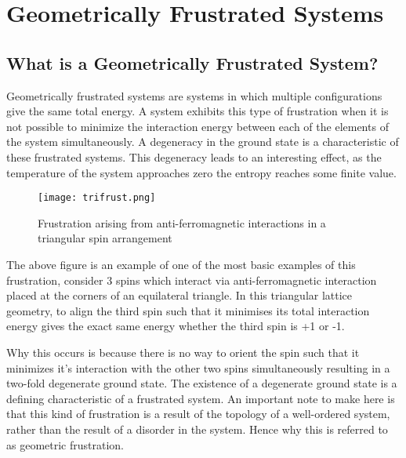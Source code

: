 \section{Geometrically Frustrated Systems}
\subsection{What is a Geometrically Frustrated System?}
Geometrically frustrated systems are systems in which multiple configurations give the same total energy.  A system exhibits this type of frustration when it is not possible to minimize the interaction energy between each of the elements of the system simultaneously. A degeneracy in the ground state is a characteristic of these frustrated systems. This degeneracy leads to an interesting effect, as the temperature of the system approaches zero the entropy reaches some finite value.
\par
\begin{figure}[ht!]
    \begin{center}
        \texttt{[image: trifrust.png]}
        \caption[Triangular spin arrangement]{Frustration arising from anti-ferromagnetic interactions in a triangular spin arrangement}
        \label{fig:gf1}
    \end{center}
\end{figure}
The above figure is an example of one of the most basic examples of this frustration, consider 3 spins which interact via anti-ferromagnetic interaction placed at the corners of an equilateral triangle. In this triangular lattice geometry, to align the third spin such that it minimises its total interaction energy gives the exact same energy whether the third spin is +1 or -1.
\par
Why this occurs is because there is no way to orient the spin such that it minimizes it's interaction with the other two spins simultaneously resulting in a two-fold degenerate ground state. The existence of a degenerate ground state is a defining characteristic of a frustrated system. An important note to make here is that this kind of frustration is a result of the topology of a well-ordered system, rather than the result of a disorder in the system.  Hence why this is referred to as geometric frustration.
\par
